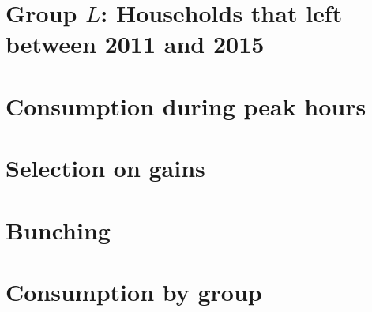 \documentclass[12pt]{article}
\begin{document}
\begin{appendices}
  

\clearpage

\clearpage

\section{Group $L$: Households that left between 2011 and 2015}

  \setcounter{figure}{0}

  \label{appendix:appendix_groupL}

  

\clearpage

\section{Consumption during peak hours}

  \setcounter{figure}{0}

  \label{appendix:appendix_peakConsumption}

  

\clearpage

\section{Selection on gains}

\setcounter{figure}{0}

  \label{appendix:appendix_savings}

  

  \clearpage

\section{Bunching}

  \setcounter{figure}{0}

  \label{appendix:appendix_bunching}

  

\clearpage

\section{Consumption by group}

  \setcounter{figure}{0}

  \label{appendix:consumptionByGroup}

  

\clearpage

\end{appendices}
\end{document}
